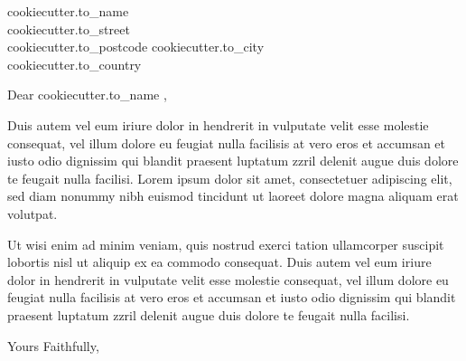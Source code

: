 \documentclass[a4paper]{scrlttr2}
\begin{document}
\begin{letter}{
{{ cookiecutter.to_name }} \\
{{ cookiecutter.to_street }} \\
{{ cookiecutter.to_postcode }} 
{{ cookiecutter.to_city }} \\
{{ cookiecutter.to_country }}
}

\KOMAoptions{}

\opening{Dear {{ cookiecutter.to_name }},}

Duis autem vel eum iriure dolor in hendrerit in vulputate velit esse molestie consequat, vel illum dolore eu feugiat nulla facilisis at vero eros et accumsan et iusto odio dignissim qui blandit praesent luptatum zzril delenit augue duis dolore te feugait nulla facilisi. Lorem ipsum dolor sit amet, consectetuer adipiscing elit, sed diam nonummy nibh euismod tincidunt ut laoreet dolore magna aliquam erat volutpat.   

Ut wisi enim ad minim veniam, quis nostrud exerci tation ullamcorper suscipit lobortis nisl ut aliquip ex ea commodo consequat. Duis autem vel eum iriure dolor in hendrerit in vulputate velit esse molestie consequat, vel illum dolore eu feugiat nulla facilisis at vero eros et accumsan et iusto odio dignissim qui blandit praesent luptatum zzril delenit augue duis dolore te feugait nulla facilisi.   

\closing{Yours Faithfully,}
\end{letter}
\end{document}
